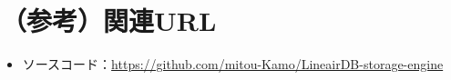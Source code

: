 \documentclass[uplatex,a4paper,12pt]{jsarticle}
\begin{document}
\section*{（参考）関連URL} %
\begin{itemize}
  \item ソースコード：\url{https://github.com/mitou-Kamo/LineairDB-storage-engine}
\end{itemize}
\end{document}
